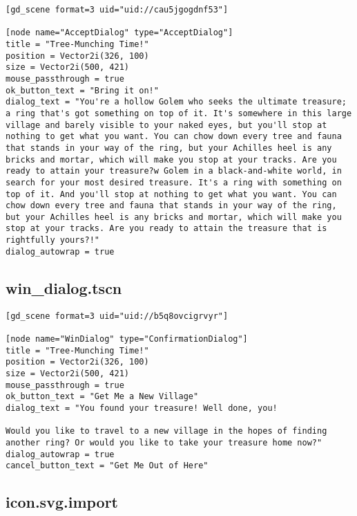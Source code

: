 \begin{lstlisting}
[gd_scene format=3 uid="uid://cau5jgogdnf53"]

[node name="AcceptDialog" type="AcceptDialog"]
title = "Tree-Munching Time!"
position = Vector2i(326, 100)
size = Vector2i(500, 421)
mouse_passthrough = true
ok_button_text = "Bring it on!"
dialog_text = "You're a hollow Golem who seeks the ultimate treasure; a ring that's got something on top of it. It's somewhere in this large village and barely visible to your naked eyes, but you'll stop at nothing to get what you want. You can chow down every tree and fauna that stands in your way of the ring, but your Achilles heel is any bricks and mortar, which will make you stop at your tracks. Are you ready to attain your treasure?w Golem in a black-and-white world, in search for your most desired treasure. It's a ring with something on top of it. And you'll stop at nothing to get what you want. You can chow down every tree and fauna that stands in your way of the ring, but your Achilles heel is any bricks and mortar, which will make you stop at your tracks. Are you ready to attain the treasure that is rightfully yours?!"
dialog_autowrap = true
\end{lstlisting}

\subsection{win\_dialog.tscn}

\begin{lstlisting}
[gd_scene format=3 uid="uid://b5q8ovcigrvyr"]

[node name="WinDialog" type="ConfirmationDialog"]
title = "Tree-Munching Time!"
position = Vector2i(326, 100)
size = Vector2i(500, 421)
mouse_passthrough = true
ok_button_text = "Get Me a New Village"
dialog_text = "You found your treasure! Well done, you!

Would you like to travel to a new village in the hopes of finding another ring? Or would you like to take your treasure home now?"
dialog_autowrap = true
cancel_button_text = "Get Me Out of Here"
\end{lstlisting}

\subsection{icon.svg.import}

